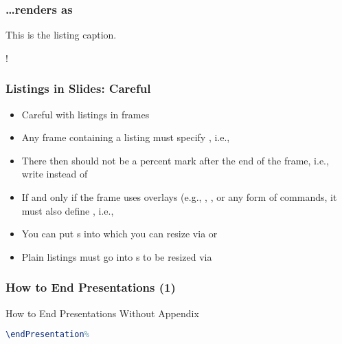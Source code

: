 \documentclass[mathserif]{beamer}%
\begin{document}
%
\begin{frame}[containsverbatim]%
\frametitle{{\dots}renders as}%
\begin{center}%
\begin{listingBlock}[0.8]{This is the listing caption.}%
\begin{scaledBox}{0.8\paperwidth}{!}%
\parbox{1.5\paperwidth}{%
%
}%
\end{scaledBox}%
\end{listingBlock}%
\end{center}%
\end{frame}%
%
\begin{frame}%
\frametitle{Listings in Slides: Careful}%
\begin{itemize}%
\item Careful with listings in frames%
\item<2-> Any frame containing a listing must specify \codeil{[containsverbatim]}, i.e., %
\item<3-> There then should not be a percent mark after the end of the frame, i.e., write  instead of 
\item<4-> If and only if the frame uses overlays (e.g., , , or any \codeBox{\texttt{<>}} form of commands, it must also define , i.e.,  %
\item<5-> You can put s into  which you can resize via  or %
\item<6-> Plain listings  must go into s to be resized via %
\end{itemize}%
\end{frame}%
%
\endPresentation%
%
\appendices{}%
%
%
%
\begin{frame}[containsverbatim]%
\frametitle{How to End Presentations (1)}%
\begin{center}%
\begin{listingBlock}[0.8]{How to End Presentations Without Appendix}%
\begin{lstlisting}[language=TeX]
\endPresentation%
\end{lstlisting}%
\end{listingBlock}%
\end{center}%
\end{frame}%
\end{document}
